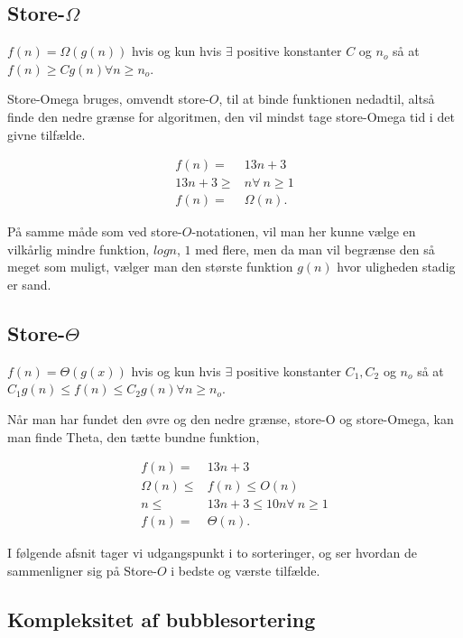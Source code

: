 \subsection{Store-$\Omega$}
\begin{defn}
$f(n) = \Omega(g(n))$ hvis og kun hvis $\exists$ positive konstanter $C$ og $n_o$ så at $f(n) \geq C g(n) \forall n \geq n_o$.
\end{defn}
Store-Omega bruges, omvendt store-$O$, til at binde funktionen nedadtil, altså finde den nedre grænse for algoritmen, den vil mindst tage store-Omega tid i det givne tilfælde.
\begin{exmp}
\begin{align*}
f(n)=& 13n+3 \\
13n+3 \geq& n \forall \ n \geq 1 \\
f(n) =& \Omega(n).
\end{align*}
\end{exmp}

På samme måde som ved store-$O$-notationen, vil man her kunne vælge en vilkårlig mindre funktion, $logn$, $1$ med flere, men da man vil begrænse den så meget som muligt, vælger man den største funktion $g(n)$ hvor uligheden stadig er sand.
\subsection{Store-$\Theta$}
\begin{defn}
$f(n) = \Theta(g(x))$ hvis og kun hvis $\exists$ positive konstanter $C_1, C_2$ og $n_o$ så at $C_1g(n) \leq f(n) \leq C_2g(n) \forall n \geq n_o$.
\end{defn}
Når man har fundet den øvre og den nedre grænse, store-O og store-Omega, kan man finde Theta, den tætte bundne funktion,
\begin{exmp}
\begin{align*}
f(n)=& 13n+3 \\
\Omega(n) \leq& f(n) \leq O(n) \\
n \leq& 13n+3 \leq 10n \forall \ n \geq 1 \\
f(n) =& \Theta(n).
\end{align*}
\end{exmp}

I følgende afsnit tager vi udgangspunkt i to sorteringer, og ser hvordan de sammenligner sig på Store-$O$ i bedste og værste tilfælde.

\subsection{Kompleksitet af bubblesortering} \label{kap:kom_bubble}


